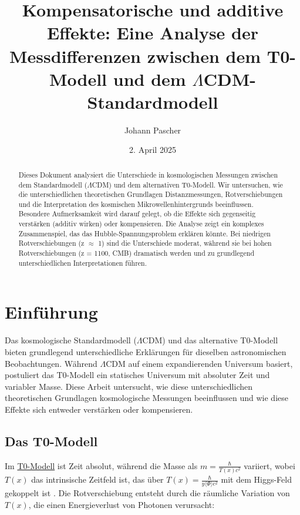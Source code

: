 \documentclass[a4paper,12pt]{article}
\newcommand{\Tfield}{T(x)}
\newcommand{\repobase}{https://github.com/jpascher/T0-Time-Mass-Duality/tree/main/2/}
\begin{document}
	
	\title{Kompensatorische und additive Effekte: Eine Analyse der Messdifferenzen zwischen dem T0-Modell und dem \(\Lambda\)CDM-Standardmodell}
	\author{Johann Pascher}
	\date{2. April 2025}
	\maketitle
	
	\begin{abstract}
		Dieses Dokument analysiert die Unterschiede in kosmologischen Messungen zwischen dem Standardmodell (\(\Lambda\)CDM) und dem alternativen T0-Modell. Wir untersuchen, wie die unterschiedlichen theoretischen Grundlagen Distanzmessungen, Rotverschiebungen und die Interpretation des kosmischen Mikrowellenhintergrunds beeinflussen. Besondere Aufmerksamkeit wird darauf gelegt, ob die Effekte sich gegenseitig verstärken (additiv wirken) oder kompensieren. Die Analyse zeigt ein komplexes Zusammenspiel, das das Hubble-Spannungsproblem erklären könnte. Bei niedrigen Rotverschiebungen (z \(\approx\) 1) sind die Unterschiede moderat, während sie bei hohen Rotverschiebungen (z = 1100, CMB) dramatisch werden und zu grundlegend unterschiedlichen Interpretationen führen.
	\end{abstract}
	
	\tableofcontents
	\newpage
	
	\section{Einführung}
	
	Das kosmologische Standardmodell (\(\Lambda\)CDM) und das alternative T0-Modell bieten grundlegend unterschiedliche Erklärungen für dieselben astronomischen Beobachtungen. Während \(\Lambda\)CDM auf einem expandierenden Universum basiert, postuliert das T0-Modell ein statisches Universum mit absoluter Zeit und variabler Masse. Diese Arbeit untersucht, wie diese unterschiedlichen theoretischen Grundlagen kosmologische Messungen beeinflussen und wie diese Effekte sich entweder verstärken oder kompensieren.
	
	\subsection{Das T0-Modell}
	
	Im {\small\href{\repobase/pdf/Deutsch/Wesentliche mathematische Formalismen der Zeit-Masse-Dualitätstheorie mit Lagrange-Dichten_de.pdf}{T0-Modell}} ist Zeit absolut, während die Masse als \( m = \frac{\hbar}{\Tfield c^2} \) variiert, wobei \( \Tfield \) das intrinsische Zeitfeld ist, das über \( \Tfield = \frac{\hbar}{y \langle \Phi \rangle c^2} \) mit dem Higgs-Feld gekoppelt ist \cite{pascher_galaxies_2025}. Die Rotverschiebung entsteht durch die räumliche Variation von \( \Tfield \), die einen Energieverlust von Photonen verursacht:
	
\end{document}
